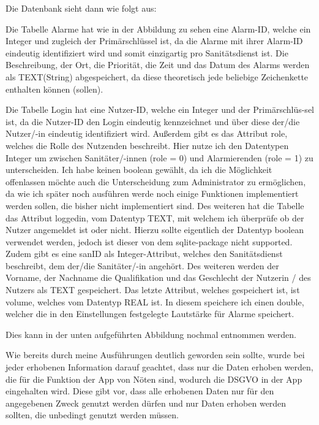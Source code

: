 
    \vspace{5mm}
    \noindent Die Datenbank sieht dann wie folgt aus: 

    \vspace{5mm}
    \noindent Die Tabelle Alarme hat wie in der Abbildung zu sehen eine Alarm-ID, welche ein Integer und zugleich der Primärschlüssel ist, da die Alarme mit ihrer Alarm-ID eindeutig identifiziert wird und somit einzigartig pro Sanitätsdienst ist.
    Die Beschreibung, der Ort, die Priorität, die Zeit und das Datum des Alarms werden als TEXT(String) abgespeichert, da diese theoretisch jede beliebige Zeichenkette enthalten können (sollen).

    \noindent Die Tabelle Login hat eine Nutzer-ID, welche ein Integer und der Primärschlüs-sel ist, da die Nutzer-ID den Login eindeutig kennzeichnet und über diese der/die Nutzer/-in eindeutig identifiziert wird.
    Außerdem gibt es das Attribut role, welches die Rolle des Nutzenden beschreibt. Hier nutze ich den Datentypen Integer um zwischen Sanitäter/-innen (role = 0) und Alarmierenden (role = 1) zu unterscheiden.
    Ich habe keinen boolean gewählt, da ich die Möglichkeit offenlassen möchte auch die Unterscheidung zum Administrator zu ermöglichen, da wie ich später noch ausführen werde noch einige Funktionen implementiert werden sollen, die 
    bisher nicht implementiert sind.
    Des weiteren hat die Tabelle das Attribut loggedin, vom Datentyp TEXT, mit welchem ich überprüfe ob der Nutzer angemeldet ist oder nicht. Hierzu sollte eigentlich der Datentyp boolean verwendet werden, jedoch ist dieser von dem sqlite-package nicht supported\cite{sqlite-Datatypes}.
    Zudem gibt es eine sanID als Integer-Attribut, welches den Sanitätsdienst beschreibt, dem der/die Sanitäter/-in angehört.
    Des weiteren werden der Vorname, der Nachname die Qualifikation und das Geschlecht der Nutzerin / des Nutzers als TEXT gespeichert.
    Das letzte Attribut, welches gespeichert ist, ist volume, welches vom Datentyp REAL ist. In diesem speichere ich einen double, welcher die in den Einstellungen festgelegte Lautstärke für Alarme speichert.

    \noindent Dies kann in der unten aufgeführten Abbildung nochmal entnommen werden.

    \noindent Wie bereits durch meine Ausführungen deutlich geworden sein sollte, wurde bei jeder erhobenen Information darauf geachtet, dass nur die Daten erhoben werden, die 
    für die Funktion der App von Nöten sind, wodurch die DSGVO in der App eingehalten wird.
    Diese gibt vor, dass alle erhobenen Daten nur für den angegebenen Zweck genutzt werden dürfen und nur Daten erhoben werden sollten, die unbedingt genutzt werden müssen\cite{DSGVO}.
